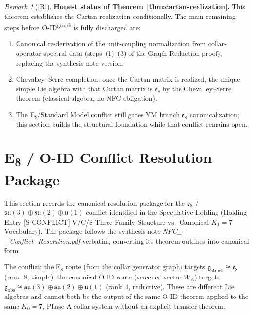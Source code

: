 \documentclass[12pt,oneside]{amsbook}
\theoremstyle{plain}
\theoremstyle{definition}
\theoremstyle{remark}
\newtheorem{remark}[theorem]{Remark}
\newcommand{\status}[1]{\textup{[#1]}}
\begin{document}
\begin{remark}[\status{R}]\label{rem:cartan-honest}
\textbf{Honest status of Theorem~\ref{thm:cartan-realization}.}
This theorem establishes the Cartan realization conditionally. The
main remaining steps before O-ID\textsuperscript{graph} is fully
discharged are:
\begin{enumerate}[label=\textup{(\arabic*)}]
 \item Canonical re-derivation of the unit-coupling normalization
 from collar-operator spectral data (steps~(1)--(3) of the
 Graph Reduction proof), replacing the synthesis-note version.
 \item Chevalley--Serre completion: once the Cartan matrix is
 realized, the unique simple Lie algebra with that Cartan matrix
 is $\mathfrak{e}_8$ by the Chevalley--Serre theorem (classical
 algebra, no NFC obligation).
 \item The E$_8$/Standard Model conflict still gates YM branch
 $\mathfrak{e}_8$ canonicalization; this section builds the
 structural foundation while that conflict remains open.
\end{enumerate}
\end{remark}

\section{E\textsubscript{8} / O-ID Conflict Resolution Package}
\label{sec:conflict-resolution}

This section records the canonical resolution package for the
$\mathfrak{e}_8$ / $\mathfrak{su}(3)\oplus\mathfrak{su}(2)\oplus
\mathfrak{u}(1)$ conflict identified in the Speculative Holding
(Holding Entry [S-CONFLICT] V/C/S Three-Family Structure vs.\
Canonical $K_0=7$ Vocabulary). The package follows the synthesis note
\emph{NFC\_-\_Conflict\_Resolution.pdf} verbatim, converting its theorem
outlines into canonical form.

The conflict: the E$_8$ route (from the collar generator graph)
targets $\mathfrak{g}_{\mathrm{struct}} \cong \mathfrak{e}_8$ (rank~8,
simple); the canonical O-ID route (screened sector $W_A$) targets
$\mathfrak{g}_{\mathrm{obs}} \cong
\mathfrak{su}(3)\oplus\mathfrak{su}(2)\oplus\mathfrak{u}(1)$
(rank~4, reductive). These are different Lie algebras and cannot
both be the output of the same O-ID theorem applied to the same
$K_0 = 7$, Phase-A collar system without an explicit transfer theorem.
\end{document}
